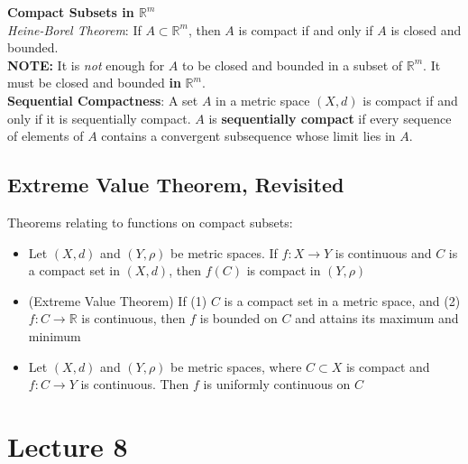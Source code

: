 \documentclass{article}
\newcommand{\R}{\mathbb{R}}
\begin{document}
\bigskip 
\textbf{Compact Subsets in $\R^m$}
\smallskip \\
\textit{Heine-Borel Theorem}: If $A\subset\R^m$, then $A$ is compact if and only if $A$ is closed and bounded.
\smallskip \\
\textbf{NOTE:} It is \textit{not} enough for $A$ to be closed and bounded in a subset of $\R^m$. It must be closed and bounded \textbf{in} $\R^m$.
\medskip \\
\textbf{Sequential Compactness}: A set $A$ in a metric space $(X,d)$ is compact if and only if it is sequentially compact. $A$ is \textbf{sequentially compact} if every sequence of elements of $A$ contains a convergent subsequence whose limit lies in $A$.


\subsection{Extreme Value Theorem, Revisited}
Theorems relating to functions on compact subsets:
\begin{itemize}
	\item Let $(X,d)$ and $(Y,\rho)$ be metric spaces. If $f:X\rightarrow Y$ is continuous and $C$ is a compact set in $(X,d)$, then $f(C)$ is compact in $(Y,\rho)$
	\item (Extreme Value Theorem) If (1) $C$ is a compact set in a metric space, and (2) $f:C\rightarrow\R$ is continuous, then $f$ is bounded on $C$ and attains its maximum and minimum
	\item  Let $(X,d)$ and $(Y,\rho)$ be metric spaces, where $C\subset X$ is compact and $f:C\rightarrow Y$ is continuous. Then $f$ is uniformly continuous on $C$
\end{itemize}



\section{Lecture 8}
\end{document}
